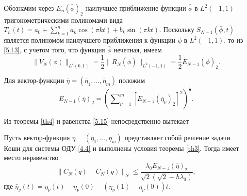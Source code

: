Обозначим через $E_n(\bar\phi)_2$ наилучшее приближение функции $\bar\phi$ в $L^2(-1,1)$ тригонометрическими полиномами вида $T_n(t)=a_0+\sum_{k=1}^{n}a_k\cos(\pi kt)+b_k\sin(\pi kt)$. Поскольку $S_{N-1}(\bar\phi,t)$ является полиномом наилучшего приближения к функции $\bar\phi$ в $L^2(-1,1)$, то из \eqref{5.13}, с учетом того, что функция $\bar\phi$ нечетная, имеем
\begin{equation}\label{5.15}
\|V_N(\phi)\|_{L^2(0,1)}=\frac12\|R_N(\bar\phi)\|_{L^2(-1,1)}=\frac12E_{N-1}(\bar\phi)_2.
\end{equation}


Для вектор-функции $\bar\eta=(\bar\eta_1,\ldots,\bar\eta_m)$ положим
$$
E_ {N-1}(\bar\eta)_2=\left(\sum\nolimits_{\nu=1}^m [E_ {N-1}(\bar\eta_\nu)_2]^2\right)^\frac12.
$$

Из теоремы \ref{th4} и равенства \eqref{5.15} непосредственно вытекает
\begin{corollary}\label{cor1}Пусть вектор-функция $\eta=(\eta_1,\ldots,\eta_m)$ представляет собой решение задачи Коши для системы ОДУ \eqref{4.4} и выполнены условия теоремы \ref{th3}. Тогда имеет место неравенство
	\begin{equation}\label{5.16}
	\|C_N(q)-\bar C_N(q)\|_N\le \frac{\lambda_0 E_{N-1}(\bar\eta)_2} {\sqrt{2}(\sqrt{2}-h\lambda_0)},
	\end{equation}
	где $\bar\eta_\nu(t)=\eta_\nu(t)-\eta_\nu(0)-(\eta_\nu(1)-\eta_\nu(0))t$.
\end{corollary}

